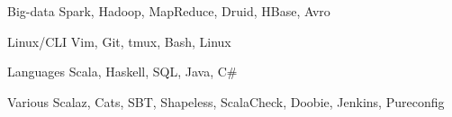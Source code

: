 

\begin{cvskills}

  \cvskill
    {Big-data}
    {Spark, Hadoop, MapReduce, Druid, HBase, Avro}

  \cvskill
    {Linux/CLI}
    {Vim, Git, tmux, Bash, Linux}

  \cvskill
    {Languages}
    {Scala, Haskell, SQL, Java, C\#}

  \cvskill
    {Various}
    {Scalaz, Cats, SBT, Shapeless, ScalaCheck, Doobie, Jenkins, Pureconfig}

\end{cvskills}
